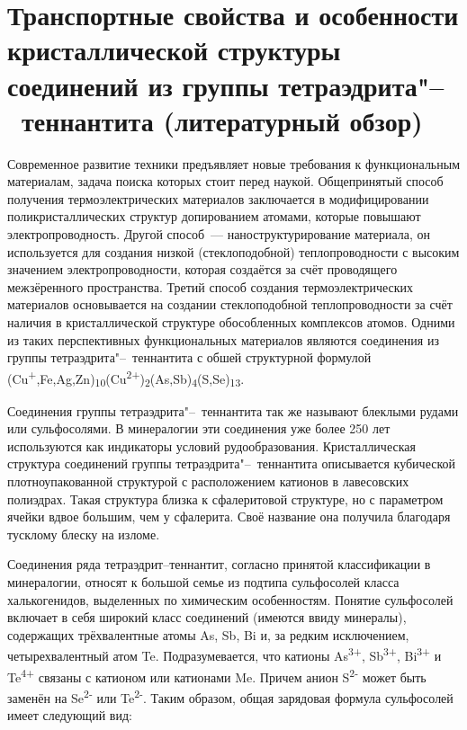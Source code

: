 \chapter{Транспортные свойства и особенности кристаллической структуры соединений из группы тетраэдрита"--~теннантита (литературный обзор)} \label{chapt1}

Современное развитие техники предъявляет новые требования к функциональным материалам, задача поиска которых стоит перед наукой. Общепринятый способ получения термоэлектрических материалов заключается в модифицировании поликристаллических структур допированием атомами, которые повышают электропроводность. Другой способ~--- наноструктурирование материала, он используется для создания низкой (стеклоподобной) теплопроводности с высоким значением электропроводности, которая создаётся за счёт проводящего межзёренного пространства. Третий способ создания термоэлектрических материалов основывается на создании стеклоподобной теплопроводности за счёт наличия в кристаллической структуре обособленных комплексов атомов. Одними из таких перспективных функциональных материалов являются соединения из группы тетраэдрита"--~теннантита с обшей структурной формулой (Cu\textsuperscript{+},Fe,Ag,Zn)\textsubscript{10}(Cu\textsuperscript{2+})\textsubscript{2}(As,Sb)\textsubscript{4}(S,Se)\textsubscript{13}.

Соединения группы тетраэдрита"--~теннантита так же называют блеклыми рудами или сульфосолями. В минералогии эти соединения уже более 250 лет используются как индикаторы условий рудообразования. Кристаллическая структура соединений группы тетраэдрита"--~теннантита описывается кубической плотноупакованной структурой с расположением катионов в лавесовских полиэдрах. Такая структура близка к сфалеритовой структуре, но с параметром ячейки вдвое большим, чем у сфалерита. Своё название она получила благодаря тусклому блеску на изломе. 

Соединения ряда тетраэдрит--теннантит, согласно принятой классификации в минералогии\cite{Molo2008}, относят к большой семье из подтипа сульфосолей класса халькогенидов, выделенных по химическим особенностям.  
Понятие сульфосолей включает в себя широкий класс соединений (имеются ввиду минералы), содержащих трёхвалентные атомы As, Sb, Bi и, за редким исключением, четырехвалентный атом Te. 
Подразумевается, что катионы As\textsuperscript{3+}, Sb\textsuperscript{3+}, Bi\textsuperscript{3+} и Te\textsuperscript{4+} связаны с катионом или катионами Me. 
Причем анион  S\textsuperscript{2-} может быть заменён на Se\textsuperscript{2-} или Te\textsuperscript{2-}. Таким образом, общая зарядовая формула сульфосолей имеет следующий вид:

